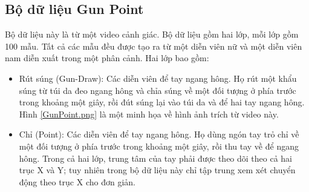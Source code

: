 \documentclass[13pt,oneside]{scrbook}
\begin{document}
\subsection{Bộ dữ liệu Gun Point}
Bộ dữ liệu này là từ một video cảnh giác. Bộ dữ liệu gồm hai lớp, mỗi lớp gồm 100 mẫu. Tất cả các mẫu đều được tạo ra từ một diễn viên nữ và một diễn viên nam diễn xuất trong một phân cảnh.  Hai lớp bao gồm:
\begin{itemize}
\item Rút súng (Gun-Draw): Các diễn viên để tay ngang hông. Họ rút một khẩu súng từ túi da đeo ngang hông và chỉa súng về một đối tượng ở phía trước trong khoảng một giây, rồi đút súng lại vào túi da và để hai tay ngang hông. Hình \ref{GunPoint.png} là một minh họa về hình ảnh trích từ video này.
\item Chỉ (Point): Các diễn viên để tay ngang hông. Họ dùng ngón tay trỏ chỉ về một đối tượng ở phía trước trong khoảng một giây, rồi thu tay về để ngang hông.
Trong cả hai lớp, trung tâm của tay phải được theo dõi theo cả hai trục X và Y; tuy nhiên trong bộ dữ liệu này chỉ tập trung xem xét chuyển động theo trục X cho đơn giản.
\end{itemize}
\end{document}
